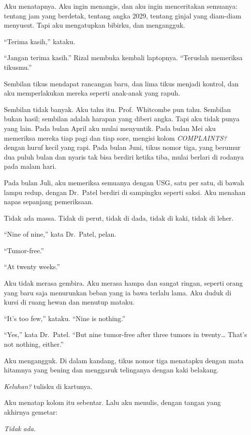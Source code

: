 \documentclass[11pt,twoside,openany]{book}
\makeatletter
\newcommand{\scenebreak}{\par\vspace{0.9em}{\centering\textsc{*\hspace{0.7em}*\hspace{0.7em}*}\par}\vspace{0.9em}\@afterindentfalse\@afterheading}
\makeatother
\begin{document}
Aku menatapnya. Aku ingin menangis, dan aku ingin menceritakan semuanya: tentang jam yang berdetak, tentang angka 2029, tentang ginjal yang diam-diam menyusut. Tapi aku mengatupkan bibirku, dan mengangguk.

``Terima kasih,'' kataku.

``Jangan terima kasih.'' Rizal membuka kembali laptopnya. ``Teruslah memeriksa tikusmu.''

\scenebreak
Sembilan tikus mendapat rancangan baru, dan lima tikus menjadi kontrol, dan aku memperlakukan mereka seperti anak-anak yang rapuh.

Sembilan tidak banyak. Aku tahu itu. Prof.~Whitcombe pun tahu. Sembilan bukan hasil; sembilan adalah harapan yang diberi angka. Tapi aku tidak punya yang lain. Pada bulan April aku mulai menyuntik. Pada bulan Mei aku memeriksa mereka tiap pagi dan tiap sore, mengisi kolom \emph{COMPLAINTS?} dengan huruf kecil yang rapi. Pada bulan Juni, tikus nomor tiga, yang berumur dua puluh bulan dan nyaris tak bisa berdiri ketika tiba, mulai berlari di rodanya pada malam hari.

Pada bulan Juli, aku memeriksa semuanya dengan USG, satu per satu, di bawah lampu redup, dengan Dr.~Patel berdiri di sampingku seperti saksi. Aku menahan napas sepanjang pemeriksaan.

Tidak ada massa. Tidak di perut, tidak di dada, tidak di kaki, tidak di leher.

``Nine of nine,'' kata Dr.~Patel, pelan.

``Tumor-free.''

``At twenty weeks.''

Aku tidak merasa gembira. Aku merasa hampa dan sangat ringan, seperti orang yang baru saja menurunkan beban yang ia bawa terlalu lama. Aku duduk di kursi di ruang hewan dan menutup mataku.

``It's too few,'' kataku. ``Nine is nothing.''

``Yes,'' kata Dr.~Patel. ``But nine tumor-free after three tumors in twenty\ldots{} That's not nothing, either.''

Aku mengangguk. Di dalam kandang, tikus nomor tiga menatapku dengan mata hitamnya yang bening dan menggaruk telinganya dengan kaki belakang.

\emph{Keluhan?} tulisku di kartunya.

Aku menatap kolom itu sebentar. Lalu aku menulis, dengan tangan yang akhirnya gemetar:

\emph{Tidak ada.}
\end{document}
